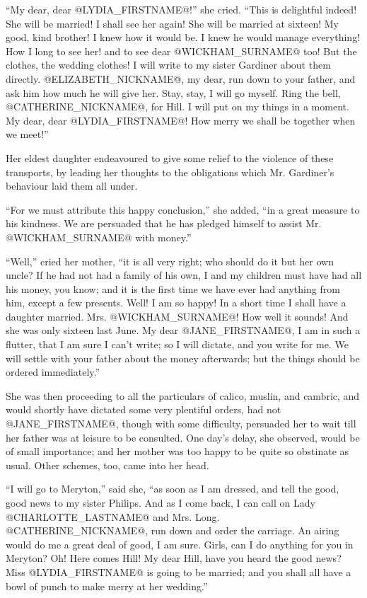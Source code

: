 ``My dear, dear @LYDIA_FIRSTNAME@!'' she cried. ``This is delightful indeed! She will
be married! I shall see her again! She will be married at sixteen!
My good, kind brother! I knew how it would be. I knew he would manage
everything! How I long to see her! and to see dear @WICKHAM_SURNAME@ too! But the
clothes, the wedding clothes! I will write to my sister Gardiner about
them directly. @ELIZABETH_NICKNAME@, my dear, run down to your father, and ask him
how much he will give her. Stay, stay, I will go myself. Ring the bell,
@CATHERINE_NICKNAME@, for Hill. I will put on my things in a moment. My dear, dear
@LYDIA_FIRSTNAME@! How merry we shall be together when we meet!''

Her eldest daughter endeavoured to give some relief to the violence of
these transports, by leading her thoughts to the obligations which Mr.
Gardiner's behaviour laid them all under.

``For we must attribute this happy conclusion,'' she added, ``in a great
measure to his kindness. We are persuaded that he has pledged himself to
assist Mr. @WICKHAM_SURNAME@ with money.''

``Well,'' cried her mother, ``it is all very right; who should do it but
her own uncle? If he had not had a family of his own, I and my children
must have had all his money, you know; and it is the first time we have
ever had anything from him, except a few presents. Well! I am so happy!
In a short time I shall have a daughter married. Mrs. @WICKHAM_SURNAME@! How well
it sounds! And she was only sixteen last June. My dear @JANE_FIRSTNAME@, I am in
such a flutter, that I am sure I can't write; so I will dictate, and
you write for me. We will settle with your father about the money
afterwards; but the things should be ordered immediately.''

She was then proceeding to all the particulars of calico, muslin, and
cambric, and would shortly have dictated some very plentiful orders, had
not @JANE_FIRSTNAME@, though with some difficulty, persuaded her to wait till her
father was at leisure to be consulted. One day's delay, she observed,
would be of small importance; and her mother was too happy to be quite
so obstinate as usual. Other schemes, too, came into her head.

``I will go to Meryton,'' said she, ``as soon as I am dressed, and tell the
good, good news to my sister Philips. And as I come back, I can call
on Lady @CHARLOTTE_LASTNAME@ and Mrs. Long. @CATHERINE_NICKNAME@, run down and order the carriage.
An airing would do me a great deal of good, I am sure. Girls, can I do
anything for you in Meryton? Oh! Here comes Hill! My dear Hill, have you
heard the good news? Miss @LYDIA_FIRSTNAME@ is going to be married; and you shall
all have a bowl of punch to make merry at her wedding.''

